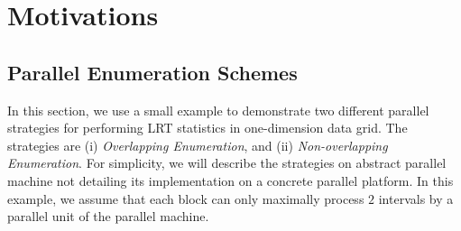 \documentclass[AMA,LATO1COL]{WileyNJD-v2-bak}
\begin{document}
\section{Motivations}
\label{sec:mov}

\subsection{Parallel Enumeration Schemes}
\label{sec:mov1}

In this section, we use a small example to demonstrate two different parallel strategies for performing LRT statistics in one-dimension data grid. The strategies are (i) \emph{Overlapping Enumeration}, and (ii) \emph{Non-overlapping Enumeration}. For simplicity, we will describe the strategies on abstract parallel machine not detailing its implementation on a concrete parallel platform. In this example, we assume that each block can only maximally process $2$ intervals by a parallel unit of the parallel machine.

\end{document}
